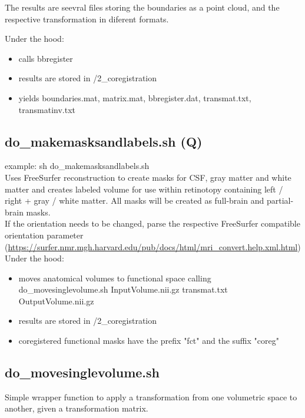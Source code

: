 \documentclass[12pt,a4paper]{scrartcl}
\begin{document}
\noindent The results are seevral files storing the boundaries as a point cloud, and the respective transformation in diferent formats.

\noindent Under the hood:
\begin{itemize}
\item calls bbregister
\item results are stored in /2\_coregistration
\item yields boundaries.mat, matrix.mat, bbregister.dat, transmat.txt, transmatinv.txt
\end{itemize}

\subsection{do\_makemasksandlabels.sh (Q)}
\label{sec:msklbl}
example: sh do\_makemasksandlabels.sh\\

\noindent Uses FreeSurfer reconstruction to create masks for CSF, gray matter and white matter and creates labeled volume for use within retinotopy containing left / right + gray / white matter. All masks will be created as full-brain and partial-brain masks.\\

\noindent If the orientation needs to be changed, parse the respective FreeSurfer compatible orientation parameter (\href{https://surfer.nmr.mgh.harvard.edu/pub/docs/html/mri_convert.help.xml.html}{https://surfer.nmr.mgh.harvard.edu/pub/docs/html/mri\_convert.help.xml.html})\\

\noindent Under the hood:
\begin{itemize}
\item moves anatomical volumes to functional space calling do\_movesinglevolume.sh InputVolume.nii.gz transmat.txt OutputVolume.nii.gz
\item results are stored in /2\_coregistration
\item coregistered functional masks have the prefix "fct" and the suffix "coreg"
\end{itemize}

\subsection{do\_movesinglevolume.sh}
Simple wrapper function to apply a transformation from one volumetric space to another, given a transformation matrix.\\
\end{document}

